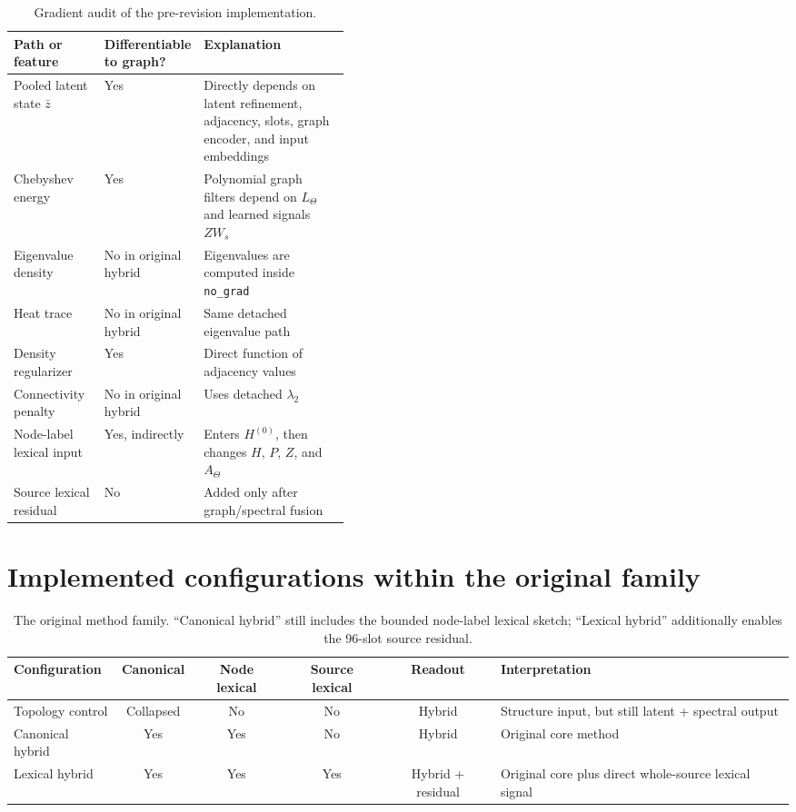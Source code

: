 \documentclass[11pt,a4paper]{article}
\begin{document}
\begin{table}[H]
\centering
\small
\begin{tabularx}{\linewidth}{@{}p{0.27\linewidth}p{0.16\linewidth}X@{}}
\toprule
Path or feature & Differentiable to graph? & Explanation \\
\midrule
Pooled latent state $\bar z$ & Yes & Directly depends on latent refinement, adjacency, slots, graph encoder, and input embeddings \\
Chebyshev energy & Yes & Polynomial graph filters depend on $L_\Theta$ and learned signals $ZW_s$ \\
Eigenvalue density & No in original hybrid & Eigenvalues are computed inside \texttt{no\_grad} \\
Heat trace & No in original hybrid & Same detached eigenvalue path \\
Density regularizer & Yes & Direct function of adjacency values \\
Connectivity penalty & No in original hybrid & Uses detached $\lambda_2$ \\
Node-label lexical input & Yes, indirectly & Enters $H^{(0)}$, then changes $H$, $P$, $Z$, and $A_\Theta$ \\
Source lexical residual & No & Added only after graph/spectral fusion \\
\bottomrule
\end{tabularx}
\caption{Gradient audit of the pre-revision implementation.}
\end{table}

\section{Implemented configurations within the original family}

\begin{table}[H]
\centering
\small
\begin{tabularx}{\linewidth}{@{}lccccX@{}}
\toprule
Configuration & Canonical & Node lexical & Source lexical & Readout & Interpretation \\
\midrule
Topology control & Collapsed & No & No & Hybrid & Structure input, but still latent + spectral output \\
Canonical hybrid & Yes & Yes & No & Hybrid & Original core method \\
Lexical hybrid & Yes & Yes & Yes & Hybrid + residual & Original core plus direct whole-source lexical signal \\
\bottomrule
\end{tabularx}
\caption{The original method family. ``Canonical hybrid'' still includes the
bounded node-label lexical sketch; ``Lexical hybrid'' additionally enables the
96-slot source residual.}
\end{table}
\end{document}
